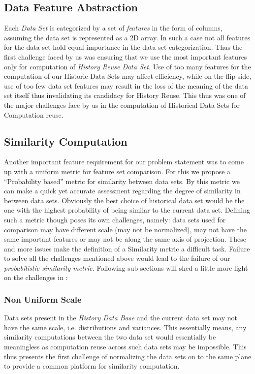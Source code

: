 \documentclass{vldb}
\begin{document}
\subsection{Data Feature Abstraction}
Each \textit{Data Set} is categorized by a set of \textit{features} in the form of columns, assuming the data set is represented as a 2D array. In such a case not all features for the data set hold equal importance in the data set categorization. Thus the first challenge faced by us was ensuring that we use the most important features only for computation of \textit{History Reuse Data Set.} 
Use of too many features for the computation of our Historic Data Sets may affect efficiency, while on the flip side, use of too few data set features may result in the loss of the meaning of the data set itself thus invalidating its candidacy for History Reuse. This thus was one of the major challenges face by us in the computation of Historical Data Sets for Computation reuse.
\subsection{Similarity Computation}
Another important feature requirement for our problem statement was to come up with a uniform metric for feature set comparison. For this we propose a “Probability based” metric for similarity between data sets. By this metric we can make a quick yet accurate assessment regarding the degree of similarity in between data sets. Obviously the best choice of historical data set would be the one with the highest probability of being similar to the current data set.
Defining such a metric though poses its own challenges, namely: data sets used for comparison may have different scale (may not be normalized), may not have the same important features or may not be along the same axis of projection. These and more issues make the definition of a Similarity metric a difficult task. Failure to solve all the challenges mentioned above would lead to the failure of our \textit{probabilistic similarity metric.}
Following sub sections will shed a little more light on the challenges in :
\subsubsection{Non Uniform Scale}
Data sets present in the \textit{History Data Base} and the current data set may not have the same scale, i.e. distributions and variances. This essentially means, any similarity computations between the two data set would essentially be meaningless as computation reuse across such data sets may be impossible. This thus presents the first challenge of normalizing the data sets on to the same plane to provide a common platform for similarity computation.
\end{document}
